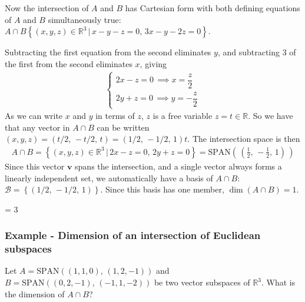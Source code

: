 \documentclass[usenames,dvipsnames,aspectratio=169,10pt]{beamer}
\def \EXAMPLEVERSION {3} %
\numberwithin{equation}{section}
\begin{document}
\begin{frame}

Now the intersection of $A$ and $B$ has Cartesian form with both defining equations of $A$ and $B$ simultaneously true: $A \cap B \left\{ (x,y,z)\in\mathbb{R}^3 \, | \, x - y - z = 0, \, 3x - y - 2z = 0\right\}$.

Subtracting the first equation from the second eliminates $y$, and subtracting 3 of the first from the second eliminates $x$, giving
\begin{align*}
\begin{cases}
2x - z = 0 \, \implies x = \dfrac{z}{2} \\
2y + z = 0 \, \implies y = -\dfrac{z}{2}
\end{cases}
\end{align*}
As we can write $x$ and $y$ in terms of $z$, $z$ is a free variable $z=t\in\mathbb{R}$. So we have that any vector in $A\cap B$ can be written $(x,y,z)=(t/2,\,-t/2,\,t)=(1/2,\,-1/2,\,1)t$. The intersection space is then
\begin{align*}
A \cap B = \left\{ \left( x,y,z \right) \in \mathbb{R}^3 \, | \, 2x-z = 0, \, 2y + z =0 \right\} = \text{SPAN}\left( \, \left( \frac{1}{2},\,-\frac{1}{2},\,1 \right) \, \right)
\end{align*}
Since this vector $\mathbf{v}$ spans the intersection, and a single vector always forms a linearly independent set, we automatically have a basis of $A \cap B$: $ \mathcal{B} = \left\{ \left( 1/2,\,-1/2,\,1 \right)\right\}$. Since this basis has one member, $\dim(A \cap B)=1$. 
\end{frame}
\fi 



\ifnum \EXAMPLEVERSION = 3
\begin{frame}
\frametitle{Example - Dimension of an intersection of Euclidean subspaces}

\noindent Let $A=\text{SPAN}((1,1,0),\,(1,2,-1))$ and $B=\text{SPAN}((0,2,-1),\,(-1,1,-2))$ be two vector subspaces of $\mathbb{R}^3$. What is the dimension of $A \cap B$?

\vspace{5cm}

\end{frame}
\end{document}
